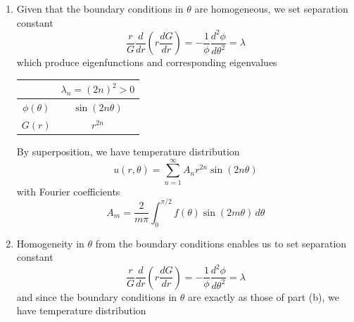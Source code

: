 \documentclass[a4paper]{article}
\begin{document}
\begin{enumerate}[label=(\alph*)]
\begin{center}
\begin{tabular}{|c||c|c|}
			\hline\hline
			\rule[-1.2em]{0pt}{3em}
					\( \phi \!\left( \theta \right) \) & \( 1 \) & \( \cos\!\left(2n \theta\right) \) \\
			\hline
			\rule[-1.2em]{0pt}{3em}
					\( G \!\left( r \right) \) & \( 1 \) & \( r^{2n} \) \\
			\hline
		\end{tabular}
	\end{center}
	By superposition, the temperature distribution is
	\[
		u \!\left( r,\theta \right) = \sum^{\infty}_{n=0} A_{n}r^{2n}\cos\!\left(2n \theta\right) 
	\]
	with Fourier coefficients
	\begin{align*}
		A_{0} & = \frac{2}{\pi}\int^{\pi / 2}_{0} f \!\left( \theta \right) \, d \theta \\
		A_{m} & = \frac{4}{\pi}\int^{\pi / 2}_{0} f \!\left( \theta \right)\cos\!\left(2m \theta\right) \, d \theta
	\end{align*}
	\item Given that the boundary conditions in \( \theta \) are homogeneous, we set separation constant
	\[
		\frac{r}{G}\frac{d }{d r}\!\left( r \frac{d G}{d r} \right) = -\frac{1}{\phi}\frac{d^2 \phi}{d \theta^2} = \lambda
	\]
	which produce eigenfunctions and corresponding eigenvalues
	\begin{center}
		\renewcommand{\arraystretch}{1.8}
		\setlength{\arraycolsep}{10pt}
		\begin{tabular}{|c||c|}
			\hline
			\rule[-1.2em]{0pt}{3em}
			 & \( \lambda_{n} = \!\left( 2n \right)^{2} > 0 \) \\
			\hline\hline
			\rule[-1.2em]{0pt}{3em}
					\( \phi \!\left( \theta \right) \) & \( \sin\!\left(2n \theta\right) \) \\
			\hline
			\rule[-1.2em]{0pt}{3em}
					\( G \!\left( r \right) \) & \( r^{2n} \) \\
			\hline
		\end{tabular}
	\end{center}
	By superposition, we have temperature distribution
	\[
		u \!\left( r,\theta \right) = \sum^{\infty}_{n=1} A_{n}r^{2n}\sin\!\left(2n \theta\right)
	\]
	with Fourier coefficients
	\[
		A_{m} = \frac{2}{m\pi}\int^{\pi / 2}_{0} f \!\left( \theta \right)\sin\!\left(2m \theta\right) \, d \theta  
	\]
	\item Homogeneity in \( \theta \) from the boundary conditions enables us to set separation constant
	\[
		\frac{r}{G}\frac{d }{d r}\!\left( r \frac{d G}{d r} \right) = -\frac{1}{\phi}\frac{d^2 \phi}{d \theta^2} = \lambda 
	\]
	and since the boundary conditions in \( \theta \) are exactly as those of part (b), we have temperature distribution

\end{enumerate}
\end{document}

